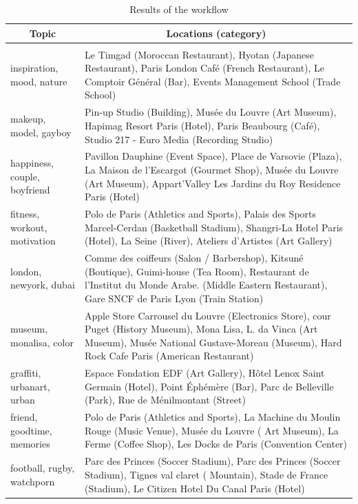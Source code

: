 \begin{longtable}{|p{2in}|p{3in}|}
  \hline \multicolumn{1}{|c|}{\textbf{Topic}} & \multicolumn{1}{c|}{\textbf{Locations (category)}} \\ \hline 
  \endhead

  \caption{Results of the workflow} \label{table:results} \\
  \endfoot
  inspiration, mood, nature & Le Timgad (Moroccan Restaurant), Hyotan (Japanese Restaurant), Paris London Café (French Restaurant), Le Comptoir Général (Bar), Events Management School (Trade School) \\ \hline 
  makeup, model, gayboy & Pin-up Studio (Building), Musée du Louvre (Art Museum), Hapimag Resort Paris (Hotel), Paris   Beaubourg (Café), Studio 217 - Euro Media (Recording Studio) \\ \hline 
  happiness, couple, boyfriend & Pavillon Dauphine (Event Space), Place de Varsovie (Plaza), La Maison de l'Escargot (Gourmet   Shop), Musée du Louvre (Art Museum), Appart'Valley Les Jardins du Roy Residence Paris (Hotel) \\ \hline 
  fitness, workout, motivation & Polo de Paris (Athletics and Sports), Palais des Sports Marcel-Cerdan (Basketball Stadium),  Shangri-La Hotel Paris (Hotel), La Seine (River), Ateliers d'Artistes (Art Gallery) \\ \hline 
  london, newyork, dubai & Comme des coiffeurs (Salon / Barbershop), Kitsuné (Boutique), Guimi-house (Tea Room), Restaurant de  l'Institut du Monde Arabe. (Middle Eastern Restaurant), Gare SNCF de Paris Lyon (Train Station) \\ \hline 
  museum, monalisa, color & Apple Store Carrousel du Louvre (Electronics Store), cour Puget (History Museum), Mona Lisa, L. da  Vinca (Art Museum), Musée National Gustave-Moreau (Museum), Hard Rock Cafe Paris (American Restaurant) \\ \hline 
  graffiti, urbanart, urban & Espace Fondation EDF (Art Gallery), Hôtel Lenox Saint Germain (Hotel), Point Éphémère (Bar),  Parc de Belleville (Park), Rue de Ménilmontant (Street) \\ \hline 
  friend, goodtime, memories & Polo de Paris (Athletics and Sports), La Machine du Moulin Rouge (Music Venue), Musée du Louvre (  Art Museum), La Ferme (Coffee Shop), Les Docks de Paris (Convention Center) \\ \hline 
  football, rugby, watchporn & Parc des Princes (Soccer Stadium), Parc des Princes (Soccer Stadium), Tignes val claret (  Mountain), Stade de France (Stadium), Le Citizen Hotel Du Canal Paris (Hotel) \\ \hline 

\end{longtable}
